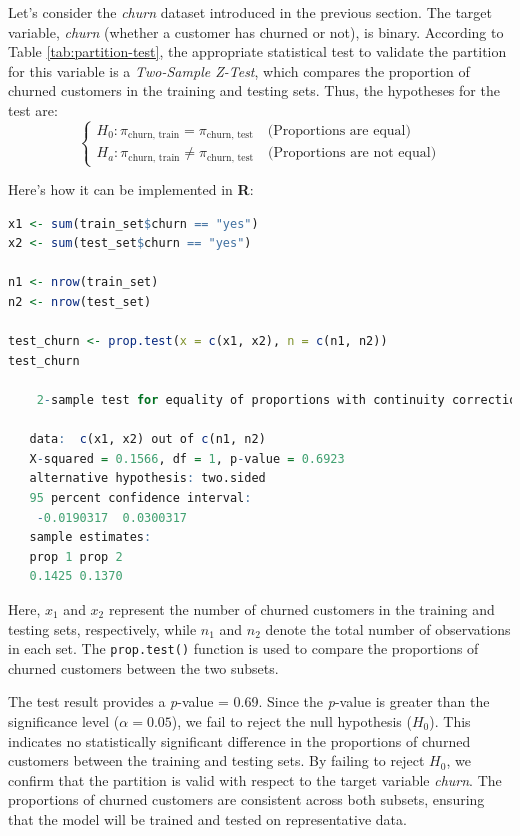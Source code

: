 \documentclass[
  11pt,
]{book}
\newcommand{\passthrough}[1]{#1}
\theoremstyle{definition}
\theoremstyle{definition}
\theoremstyle{definition}
\theoremstyle{definition}
\theoremstyle{remark}
\begin{document}
Let's consider the \emph{churn} dataset introduced in the previous section. The target variable, \emph{churn} (whether a customer has churned or not), is binary. According to Table \ref{tab:partition-test}, the appropriate statistical test to validate the partition for this variable is a \emph{Two-Sample Z-Test}, which compares the proportion of churned customers in the training and testing sets. Thus, the hypotheses for the test are:\\
\[
\begin{cases}
H_0:  \pi_{\text{churn, train}} = \pi_{\text{churn, test}} \quad \text{(Proportions are equal)} \\
H_a:  \pi_{\text{churn, train}} \neq \pi_{\text{churn, test}} \quad \text{(Proportions are not equal)}
\end{cases}
\]

Here's how it can be implemented in \textbf{R}:

\begin{lstlisting}[language=R]
x1 <- sum(train_set$churn == "yes")
x2 <- sum(test_set$churn == "yes")

n1 <- nrow(train_set)
n2 <- nrow(test_set)

test_churn <- prop.test(x = c(x1, x2), n = c(n1, n2))
test_churn
   
    2-sample test for equality of proportions with continuity correction
   
   data:  c(x1, x2) out of c(n1, n2)
   X-squared = 0.1566, df = 1, p-value = 0.6923
   alternative hypothesis: two.sided
   95 percent confidence interval:
    -0.0190317  0.0300317
   sample estimates:
   prop 1 prop 2 
   0.1425 0.1370
\end{lstlisting}

Here, \(x_1\) and \(x_2\) represent the number of churned customers in the training and testing sets, respectively, while \(n_1\) and \(n_2\) denote the total number of observations in each set. The \passthrough{\lstinline!prop.test()!} function is used to compare the proportions of churned customers between the two subsets.

The test result provides a \emph{p}-value = 0.69. Since the \emph{p}-value is greater than the significance level (\(\alpha = 0.05\)), we fail to reject the null hypothesis (\(H_0\)). This indicates no statistically significant difference in the proportions of churned customers between the training and testing sets. By failing to reject \(H_0\), we confirm that the partition is valid with respect to the target variable \emph{churn}. The proportions of churned customers are consistent across both subsets, ensuring that the model will be trained and tested on representative data.
\end{document}
